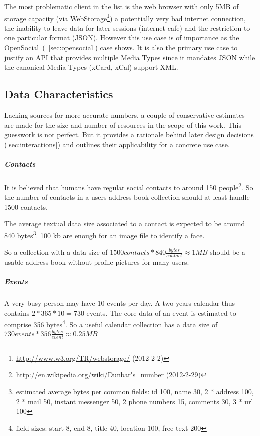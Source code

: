 \documentclass[12pt,a4paper]{scrartcl}		%
\newcommand{\citeurl}[2]{\url{#1} (#2)}
\begin{document}
The most problematic client in the list is the web browser with only 5MB of
storage capacity (via
WebStorage\footnote{\citeurl{http://www.w3.org/TR/webstorage/}{2012-2-2}}) a
potentially very bad internet connection, the inability to leave data for later
sessions (internet cafe) and the restriction to one particular format
(JSON). However this use case is of importance as the
OpenSocial~(~\ref{sec:opensocial}) case shows. It is also the primary use case
to justify an API that provides multiple Media Types since it mandates JSON
while the canonical Media Types (xCard, xCal) support XML.

\subsection{Data Characteristics}
\label{sec:data-characteristics}

Lacking sources for more accurate numbers, a couple of conservative estimates
are made for the size and number of resources in the scope of this work. This
guesswork is not perfect. But it provides a rationale behind later design
decisions (\autoref{sec:interactions}) and outlines their applicability for a concrete use case.

\subparagraph{Contacts}

It is believed that humans have regular social contacts to around 150
people\footnote{\citeurl{http://en.wikipedia.org/wiki/Dunbar's_number}{2012-2-29}}. So
the number of contacts in a users address book collection should at least handle
1500 contacts.

The average textual data size associated to a contact is expected to be around
840 bytes\footnote{estimated average bytes per common fields: id 100, name 30, 2 *
  address 100, 2 * mail 50, instant messenger 50, 2 phone numbers 15, comments
  30, 3 * url 100}. 100 kb are enough for an image file to identify a face.

So a collection with a data size of $1500 contacts * 840 \frac{bytes}{contact}
\approx 1MB$ should be a usable address book without profile pictures for many
users.

\subparagraph{Events}

A very busy person may have 10 events per day. A two years calendar thus
contains $2*365*10=730$ events. The core data of an event is estimated to
comprise 356 bytes\footnote{field sizes: start 8, end 8, title 40, location 100,
  free text 200}. So a useful calendar collection has a data size of $730 events
* 356 \frac{bytes}{event} \approx 0.25 MB$
\end{document}
